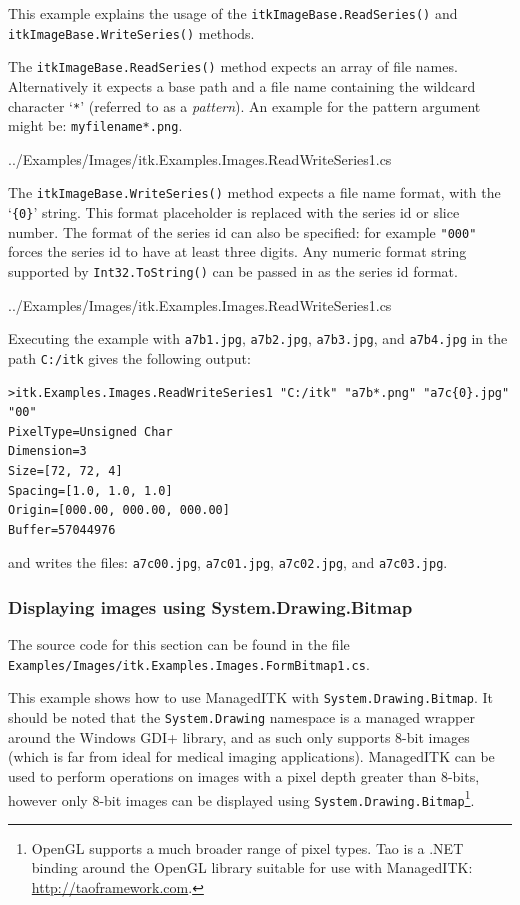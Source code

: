 \documentclass{InsightArticle}
\def\code#1{\texttt{#1}}
\begin{document}
This example explains the usage of the \code{itkImageBase.ReadSeries()} and
\code{itkImageBase.WriteSeries()} methods.

The \code{itkImageBase.ReadSeries()} method expects an array of file names.
Alternatively it expects a base path and a file name
containing the wildcard character `\code{*}' (referred to as a \emph{pattern}).
An example for the pattern argument might be: \code{myfilename*.png}.
\begin{center}
	
	{../Examples/Images/itk.Examples.Images.ReadWriteSeries1.cs}
\end{center}

The \code{itkImageBase.WriteSeries()} method expects a file name format,
with the `\code{\{0\}}' string. This format placeholder is replaced with
the series id or slice number. The format of the series id can also be
specified: for example \code{"000"} forces the series id to have at least
three digits. Any numeric format string supported by \code{Int32.ToString()}
can be passed in as the series id format.
\begin{center}
	
	{../Examples/Images/itk.Examples.Images.ReadWriteSeries1.cs}
\end{center}

Executing the example with 
\code{a7b1.jpg}, 
\code{a7b2.jpg}, 
\code{a7b3.jpg}, and 
\code{a7b4.jpg} in the path \code{C:/itk} gives the following output:
\begin{lstlisting}
>itk.Examples.Images.ReadWriteSeries1 "C:/itk" "a7b*.png" "a7c{0}.jpg" "00"
PixelType=Unsigned Char
Dimension=3
Size=[72, 72, 4]
Spacing=[1.0, 1.0, 1.0]
Origin=[000.00, 000.00, 000.00]
Buffer=57044976
\end{lstlisting}

and writes the files: 
\code{a7c00.jpg}, 
\code{a7c01.jpg}, 
\code{a7c02.jpg}, and 
\code{a7c03.jpg}.

\subsubsection{Displaying images using System.Drawing.Bitmap}
\label{sec:Examples:Bitmap1}
The source code for this section can be found in the file\\
\code{Examples/Images/itk.Examples.Images.FormBitmap1.cs}.

This example shows how to use ManagedITK with \code{System.Drawing.Bitmap}.
It should be noted that the \code{System.Drawing} namespace is a managed wrapper
around the Windows GDI+ library, and as such only supports 8-bit images 
(which is far from ideal for medical imaging applications).
ManagedITK can be used to perform operations on images with a pixel depth
greater than 8-bits, however only 8-bit images can be displayed using 
\code{System.Drawing.Bitmap}\footnote{OpenGL supports a much broader range of pixel types.
Tao is a .NET binding around the OpenGL library suitable for use with ManagedITK: 
\href{http://taoframework.com}{http://taoframework.com}.}. 
\end{document}
